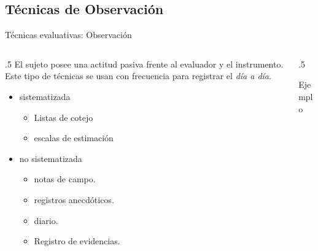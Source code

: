 \documentclass[11pt, aspectratio=169, xcolor=table,hyphens]{beamer}
\begin{document}
\subsection{Técnicas de Observación}
\begin{frame}{Técnicas evaluativas: Observación}
	\begin{columns}
		\begin{column}{.5\linewidth}
			\justifying
			El sujeto posee una actitud pasiva frente al evaluador y el instrumento. Este tipo de técnicas se usan con frecuencia para registrar el \textit{día a día}.
			\begin{itemize}
				\item sistematizada
				      \begin{itemize}
					      \item Listas de cotejo
					      \item<2-> escalas de estimación
				      \end{itemize}
				\item no sistematizada
				      \begin{itemize}
					      \item<3-> notas de campo.
					      \item<4-> registros anecdóticos.
					      \item<5-> diario.
					      \item<6-> Registro de evidencias.
				      \end{itemize}
			\end{itemize}
		\end{column}
		\begin{column}{.5\linewidth}
			\begin{exampleblock}{Ejemplo}
\end{exampleblock}
\end{column}
\end{columns}
\end{frame}
\end{document}
